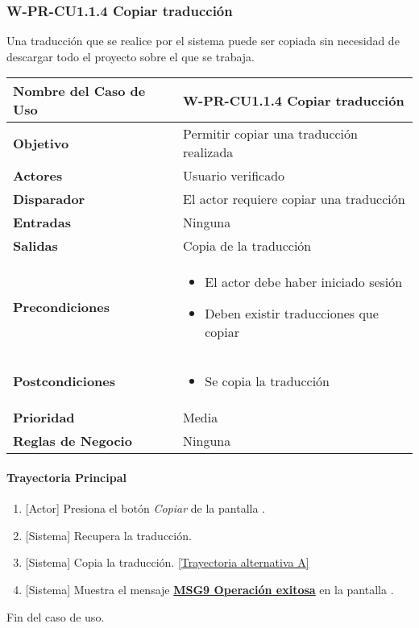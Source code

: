 \subsubsection{W-PR-CU1.1.4 Copiar traducción}
Una traducción que se realice por el sistema puede ser copiada sin necesidad de descargar todo el proyecto sobre el que se trabaja.
\begin{longtable}{|J{5cm}|J{10.3cm}|}
	\hline
	\textbf{Nombre del Caso de Uso} &
		W-PR-CU1.1.4 Copiar traducción \\ \hline
	\textbf{Objetivo} &
		Permitir copiar una traducción realizada  \\ \hline
	\textbf{Actores} &
		Usuario verificado \\ \hline 
	\textbf{Disparador} & 
		El actor requiere copiar una traducción \\ \hline 
	\textbf{Entradas} & 
		Ninguna \\ \hline 
	\textbf{Salidas} & 
		Copia de la traducción \\ \hline
	\textbf{Precondiciones} &
		\begin{itemize}
		    \item El actor debe haber iniciado sesión
		    \item Deben existir traducciones que copiar
		\end{itemize} \\ \hline
	\textbf{Postcondiciones} &
        \begin{itemize}
		    \item Se copia la traducción
		\end{itemize} \\ \hline
	\textbf{Prioridad} & 
		Media \\ \hline
	\textbf{Reglas de Negocio} & 
		Ninguna \\ \hline

\end{longtable}

\paragraph{Trayectoria Principal}
	\begin{enumerate}
	    \item {[Actor]} Presiona el botón \textit{Copiar} de la pantalla  \textbf{}.
	    \item {[Sistema]} Recupera la traducción.
	    \item {[Sistema]} Copia la traducción. \hyperref[W-PR-CU1.1.4:TA]{[Trayectoria alternativa A]}
	    \item {[Sistema]} Muestra el mensaje \hyperref[MSG9]{\bf MSG9 Operación exitosa} en la pantalla \textbf{}.
	\end{enumerate}
	Fin del caso de uso.

